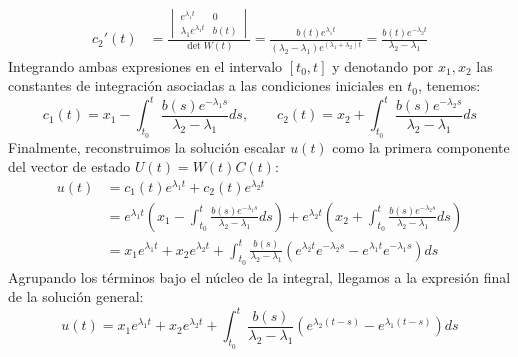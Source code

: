 {\begin{align*}
    c_2'(t) &= \frac{\begin{vmatrix} e^{\lambda_1 t} & 0 \\ \lambda_1 e^{\lambda_1 t} & b(t) \end{vmatrix}}{\det W(t)} = \frac{b(t)e^{\lambda_1 t}}{(\lambda_2 - \lambda_1)e^{(\lambda_1+\lambda_2)t}} = \frac{b(t)e^{-\lambda_2 t}}{\lambda_2 - \lambda_1}
    \end{align*}
    Integrando ambas expresiones en el intervalo $[t_0, t]$ y denotando por $x_1, x_2$ las constantes de integración asociadas a las condiciones iniciales en $t_0$, tenemos:
    \[ c_1(t) = x_1 - \int_{t_0}^{t} \frac{b(s)e^{-\lambda_1 s}}{\lambda_2 - \lambda_1} ds, \qquad c_2(t) = x_2 + \int_{t_0}^{t} \frac{b(s)e^{-\lambda_2 s}}{\lambda_2 - \lambda_1} ds \]
    Finalmente, reconstruimos la solución escalar $u(t)$ como la primera componente del vector de estado $U(t) = W(t)C(t)$:
    \begin{align*}
    u(t) &= c_1(t) e^{\lambda_1 t} + c_2(t) e^{\lambda_2 t} \\
    &= e^{\lambda_1 t} \left( x_1 - \int_{t_0}^{t} \frac{b(s)e^{-\lambda_1 s}}{\lambda_2 - \lambda_1} ds \right) + e^{\lambda_2 t} \left( x_2 + \int_{t_0}^{t} \frac{b(s)e^{-\lambda_2 s}}{\lambda_2 - \lambda_1} ds \right) \\
    &= x_1 e^{\lambda_1 t} + x_2 e^{\lambda_2 t} + \int_{t_0}^{t} \frac{b(s)}{\lambda_2 - \lambda_1} \left( e^{\lambda_2 t} e^{-\lambda_2 s} - e^{\lambda_1 t} e^{-\lambda_1 s} \right) ds 
    \end{align*}
    Agrupando los términos bajo el núcleo de la integral, llegamos a la expresión final de la solución general:
    \[ \boxed{u(t) = x_1 e^{\lambda_1 t} + x_2 e^{\lambda_2 t} + \int_{t_0}^{t} \frac{b(s)}{\lambda_2 - \lambda_1} \left( e^{\lambda_2 (t-s)} - e^{\lambda_1 (t-s)} \right) ds} \]
}


